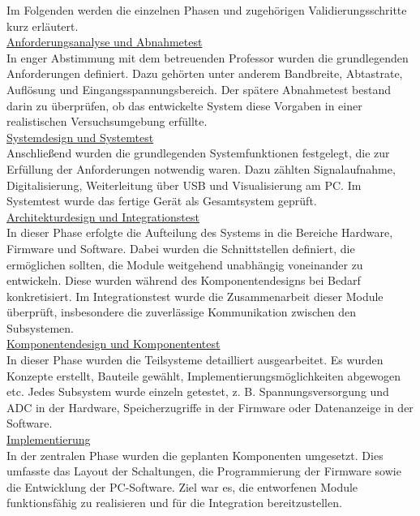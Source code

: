 \documentclass[a4paper, portrait, 12pt]{scrartcl} %
\begin{document}
Im Folgenden werden die einzelnen Phasen und zugehörigen Validierungsschritte kurz erläutert.\vspace{0.1cm}\\
\underline{Anforderungsanalyse und Abnahmetest}\\
In enger Abstimmung mit dem betreuenden Professor wurden die grundlegenden Anforderungen definiert. Dazu gehörten unter anderem Bandbreite, Abtastrate, Auflösung und Eingangsspannungsbereich. Der spätere Abnahmetest bestand darin zu überprüfen, ob das entwickelte System diese Vorgaben in einer realistischen Versuchsumgebung erfüllte.\vspace{0.1cm}\\
\underline{Systemdesign und Systemtest}\\
Anschließend wurden die grundlegenden Systemfunktionen festgelegt, die zur Erfüllung der Anforderungen notwendig waren. Dazu zählten Signalaufnahme, Digitalisierung, Weiterleitung über USB und Visualisierung am PC. Im Systemtest wurde das fertige Gerät als Gesamtsystem geprüft.\vspace{0.1cm}\\
\underline{Architekturdesign und Integrationstest}\\
In dieser Phase erfolgte die Aufteilung des Systems in die Bereiche Hardware, Firmware und Software. Dabei wurden die Schnittstellen definiert, die ermöglichen sollten, die Module weitgehend unabhängig voneinander zu entwickeln. Diese wurden während des Komponentendesigns bei Bedarf konkretisiert. Im Integrationstest wurde die Zusammenarbeit dieser Module überprüft, insbesondere die zuverlässige Kommunikation zwischen den Subsystemen.\vspace{0.1cm}\\
\underline{Komponentendesign und Komponententest}\\
In dieser Phase wurden die Teilsysteme detailliert ausgearbeitet. Es wurden Konzepte erstellt, Bauteile gewählt, Implementierungsmöglichkeiten abgewogen etc. Jedes Subsystem wurde einzeln getestet, z. B. Spannungsversorgung und ADC in der Hardware, Speicherzugriffe in der Firmware oder Datenanzeige in der Software.\vspace{0.1cm}\\
\underline{Implementierung}\\
In der zentralen Phase wurden die geplanten Komponenten umgesetzt. Dies umfasste das Layout der Schaltungen, die Programmierung der Firmware sowie die Entwicklung der PC-Software. Ziel war es, die entworfenen Module funktionsfähig zu realisieren und für die Integration bereitzustellen.\\
\end{document}
